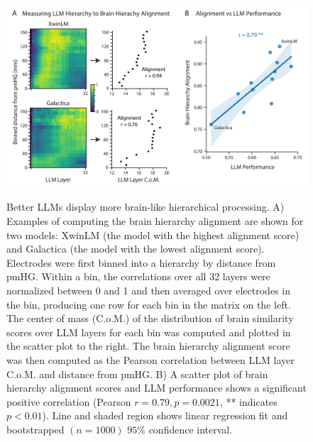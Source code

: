 \begin{figure}[!t]
  \centering
  {\includegraphics[width=0.95\linewidth]{figures/Figure_brain-model-alignment-method-distance-01.png}}
  \caption{Better LLMs display more brain-like hierarchical processing. A) Examples of computing the brain hierarchy alignment are shown for two models: XwinLM (the model with the highest alignment score) and Galactica (the model with the lowest alignment score). Electrodes were first binned into a hierarchy by distance from pmHG. Within a bin, the correlations over all 32 layers were normalized between 0 and 1 and then averaged over electrodes in the bin, producing one row for each bin in the matrix on the left. The center of mass (C.o.M.) of the distribution of brain similarity scores over LLM layers for each bin was computed and plotted in the scatter plot to the right. The brain hierarchy alignment score was then computed as the Pearson correlation between LLM layer C.o.M. and distance from pmHG. B) A scatter plot of brain hierarchy alignment scores and LLM performance shows a significant positive correlation (Pearson $r=0.79, p=0.0021$, ** indicates $p<0.01$). Line and shaded region shows linear regression fit and bootstrapped $(n=1000)$ $95\%$ confidence interval.}
  \label{fig:3}
\end{figure}

